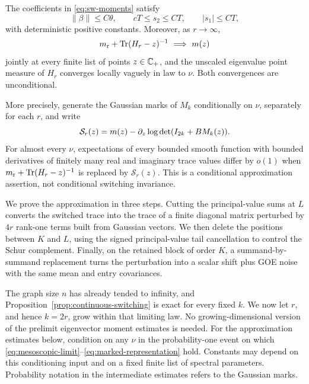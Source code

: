 \begin{proposition}\label{prop:gaussian-insertion}
The coefficients in \eqref{eq:sw-moments} satisfy
\begin{equation}\label{eq:sw-coefficient-bounds}
 \|\beta\|\le C\theta,\qquad
 cT\le s_2\le CT,\qquad |s_1|\le CT,
\end{equation}
with deterministic positive constants. Moreover, as \(r\to\infty\),
\begin{equation}\label{eq:sw-trace-limit}
 m_{\rm r}+\operatorname{Tr}(H_r-z)^{-1}
 \ \Longrightarrow\ m(z)
\end{equation}
jointly at every finite list of points \(z\in\mathbb C_+\), and the unscaled
eigenvalue point measure of \(H_r\) converges locally vaguely in law to
\(\nu\). Both convergences are unconditional.

More precisely, generate the Gaussian marks of \(M_k\) conditionally on
\(\nu\), separately for each \(r\), and write
\[
 \mathcal S_r(z)
 =m(z)-\partial_z\log\det(I_{2k}+BM_k(z)).
 \]
For almost every \(\nu\), expectations of every bounded smooth function with
bounded derivatives of finitely many real and imaginary trace values differ
by \(o(1)\) when
\(m_{\rm r}+\operatorname{Tr}(H_r-z)^{-1}\) is replaced by \(\mathcal S_r(z)\).
This is a conditional approximation assertion, not conditional switching
invariance.
\end{proposition}

We prove the approximation in three steps. Cutting the principal-value
sums at \(L\) converts the switched trace into the trace of a finite
diagonal matrix perturbed by \(4r\) rank-one terms built from Gaussian
vectors. We then
delete the positions between \(K\) and \(L\), using the signed
principal-value tail cancellation to control the Schur complement.
Finally, on the retained block of order \(K\), a summand-by-summand
replacement turns the perturbation into a scalar shift plus GOE noise
with the same mean and entry covariances.

The graph size \(n\) has already tended to infinity, and
Proposition~\ref{prop:continuous-switching} is exact for every fixed \(k\).
We now let \(r\), and hence \(k=2r\), grow within that limiting law.
No growing-dimensional version of the prelimit eigenvector moment estimates
is needed. For the approximation estimates below, condition on any \(\nu\)
in the probability-one event on which
\eqref{eq:mesoscopic-limit}--\eqref{eq:marked-representation} hold.
Constants may depend on this conditioning input and on a fixed finite list
of spectral parameters. Probability notation in the intermediate estimates
refers to the Gaussian marks.

